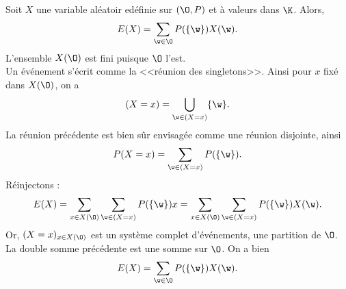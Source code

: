 \documentclass[11pt]{article}
\begin{document}
\begin{lemme}{}{}
    Soit $X$ une variable aléatoir edéfinie sur $(\O,P)$ et à valeurs dans $\K$. Alors,
    \begin{equation*}
        E(X)=\sum_{\w\in\O}P(\{\w\})X(\w).
    \end{equation*}
    \tcblower
    L'ensemble $X(\O)$ est fini puisque $\O$ l'est.\\
    Un événement s'écrit comme la <<réunion des singletons>>. Ainsi pour $x$ fixé dans $X(\O)$, on a
    \begin{equation*}
        (X=x)=\bigcup_{\w\in(X=x)}\{\w\}.
    \end{equation*}
    La réunion précédente est bien sûr envisagée comme une réunion disjointe, ainsi
    \begin{equation*}
        P(X=x)=\sum_{\w\in(X=x)}P(\{\w\}).
    \end{equation*}
    Réinjectons :
    \begin{equation*}
        E(X)=\sum_{x\in X(\O)}\sum_{\w\in(X=x)}P(\{\w\})x=\sum_{x\in X(\O)}\sum_{\w\in(X=x)}P(\{\w\})X(\w).
    \end{equation*}
    Or, $(X=x)_{x\in X(\O)}$ est un système complet d'événements, une partition de $\O$. La double somme précédente est une somme sur $\O$. On a bien
    \begin{equation*}
        E(X)=\sum_{\w\in\O}P(\{\w\})X(\w).
    \end{equation*}
\end{lemme}
\end{document}
